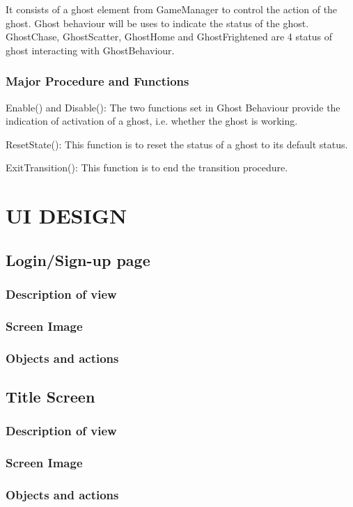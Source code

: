 \documentclass[11pt]{article}
\begin{document}
It consists of a ghost element from GameManager to control the action of the ghost. Ghost behaviour will be uses to indicate the status of the ghost. GhostChase, GhostScatter, GhostHome and GhostFrightened are 4 status of ghost interacting with GhostBehaviour.
\subsubsection{Major Procedure and Functions}
Enable() and Disable(): The two functions set in Ghost Behaviour provide the indication of activation of a ghost, i.e. whether the ghost is working.

ResetState(): This function is to reset the status of a ghost to its default status.

ExitTransition(): This function is to end the transition procedure.



\section{UI DESIGN}

\subsection{Login/Sign-up page}
\subsubsection{Description of view}
\subsubsection{Screen Image}
\subsubsection{Objects and actions}

\subsection{Title Screen}
\subsubsection{Description of view}
\subsubsection{Screen Image}
\subsubsection{Objects and actions}
\end{document}
